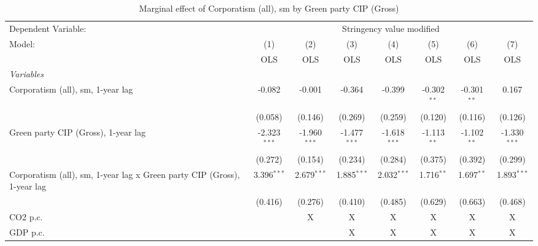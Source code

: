 
\begin{table}[htbp]
   \caption{Marginal effect of Corporatism (all), sm by Green party CIP (Gross)}
   \centering
   \begin{tabular}{lccccccc}
      \toprule
      Dependent Variable: & \multicolumn{7}{c}{Stringency value modified}\\
      Model:                                                                  & (1)            & (2)            & (3)            & (4)            & (5)           & (6)           & (7)\\  
                                                                              &  OLS           & OLS            & OLS            & OLS            & OLS           & OLS           & OLS\\  
      \midrule
      \emph{Variables}\\
      Corporatism (all), sm, 1-year lag                                       & -0.082         & -0.001         & -0.364         & -0.399         & -0.302$^{**}$ & -0.301$^{**}$ & 0.167\\   
                                                                              & (0.058)        & (0.146)        & (0.269)        & (0.259)        & (0.120)       & (0.116)       & (0.126)\\   
      Green party CIP (Gross), 1-year lag                                     & -2.323$^{***}$ & -1.960$^{***}$ & -1.477$^{***}$ & -1.618$^{***}$ & -1.113$^{**}$ & -1.102$^{**}$ & -1.330$^{***}$\\   
                                                                              & (0.272)        & (0.154)        & (0.234)        & (0.284)        & (0.375)       & (0.392)       & (0.299)\\   
      Corporatism (all), sm, 1-year lag x Green party CIP (Gross), 1-year lag & 3.396$^{***}$  & 2.679$^{***}$  & 1.885$^{***}$  & 2.032$^{***}$  & 1.716$^{**}$  & 1.697$^{**}$  & 1.893$^{***}$\\   
                                                                              & (0.416)        & (0.276)        & (0.410)        & (0.485)        & (0.629)       & (0.663)       & (0.468)\\   
      CO2 p.c.                                                                &                & X              & X              & X              & X             & X             & X\\  
      GDP p.c.                                                                &                &                & X              & X              & X             & X             & X\\  

\end{tabular}
\end{table}
